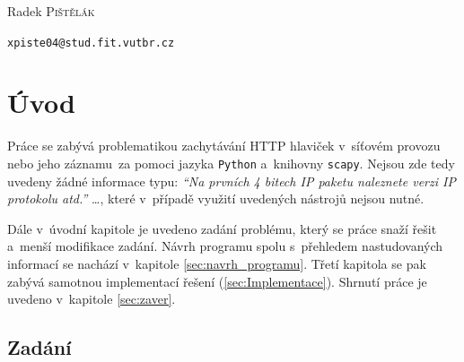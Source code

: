 \documentclass[a4paper, 11pt, titlepage]{article}
\begin{document}
\begin{titlepage}
\begin{center}

	\noindent
	\begin{minipage}{0.4\textwidth}
		\begin{flushleft} \large
			Radek \textsc{Pištělák}
		\end{flushleft}
	\end{minipage}%
	\begin{minipage}{0.4\textwidth}
		\begin{flushright} \large
			\texttt{xpiste04@stud.fit.vutbr.cz}
		\end{flushright}
	\end{minipage}

\end{center}
\end{titlepage}


\pagestyle{empty}
\tableofcontents
\newpage

\pagestyle{plain}
\setcounter{page}{1}

\section{Úvod} %
\label{sec:Uvod}

	Práce se zabývá problematikou zachytávání HTTP hlaviček v~síťovém provozu
	nebo jeho záznamu~za pomoci jazyka \texttt{Python} a~knihovny \texttt{scapy}.
	Nejsou zde tedy uvedeny žádné informace typu: \textit{``Na prvních 4 bitech IP paketu
	naleznete verzi IP protokolu atd.''} \dots, které v~případě využití uvedených 
	nástrojů nejsou nutné. 

	Dále v~úvodní kapitole je uvedeno zadání problému, který se práce snaží řešit 
	a~menší modifikace zadání. Návrh programu spolu s~přehledem nastudovaných informací 
	se nachází v~kapitole \ref{sec:navrh_programu}. Třetí kapitola se pak zabývá 
	samotnou implementací řešení (\ref{sec:Implementace}). Shrnutí práce je uvedeno
	v~kapitole \ref{sec:zaver}. 

	\subsection{Zadání} %
	\label{sub:zadani}
\end{document}
